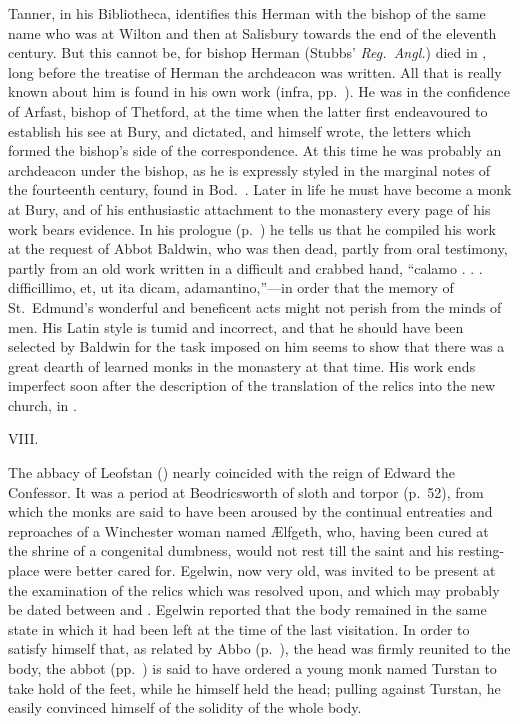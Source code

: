 \documentclass[10pt]{book}
\begin{document}
{Tanner, in his Bibliotheca, identifies this Herman with the bishop of the same name who was at Wilton and then at Salisbury towards the end of the eleventh century. But this cannot be, for bishop Herman (Stubbs' \emph{Reg.\ Angl.}) died in , long before the treatise of Herman the archdeacon was written. All that is really known about him is found in his own work (infra, pp.\ ). He was in the confidence of Arfast, bishop of Thetford, at the time when the latter first endeavoured to establish his see at Bury, and dictated, and himself wrote, the letters which formed the bishop's side of the correspondence. At this time he was probably an archdeacon under the bishop, as he is expressly styled in the marginal notes of the fourteenth century, found in Bod.\ . Later in life he must have become a monk at Bury, and of his enthusiastic attachment to the monastery every page of his work bears evidence. In his prologue (p.\ ) he tells us that he compiled his work at the request of Abbot Baldwin, who was then dead, partly from oral testimony, partly from an old work written in a difficult and crabbed hand, ``calamo . . . difficillimo, et, ut ita dicam, adamantino,''---in order that the memory of St.\ Edmund's wonderful and beneficent acts might not perish from the minds of men. His Latin style is tumid and incorrect, and that he should have been selected by Baldwin for the task imposed on him seems to show that there was a great dearth of learned monks in the monastery at that time. His work ends imperfect soon after the description of the translation of the relics into the new church, in .

\vspace{.3cm}
\begin{center}
VIII.
\end{center}
\noindent The abbacy of Leofstan () nearly coincided with the reign of Edward the Confessor. It was a period at Beodricsworth of sloth and torpor (p.\ 52), from which the monks are said to have been aroused by the continual entreaties and reproaches of a Winchester woman named \AE{}lfgeth, who, having been cured at the shrine of a congenital dumbness, would not rest till the saint and his resting-place were better cared for. Egelwin, now very old, was invited to be present at the examination of the relics which was resolved upon, and which may probably be dated between  and . Egelwin reported that the body remained in the same state in which it had been left at the time of the last visitation. In order to satisfy himself that, as related by Abbo (p.\ ), the head was firmly reunited to the body, the abbot (pp.\ ) is said to have ordered a young monk named Turstan to take hold of the feet, while he himself held the head; pulling against Turstan, he easily convinced himself of the solidity of the whole body.

}
\end{document}
